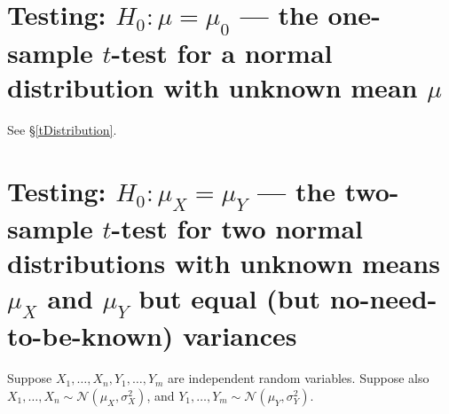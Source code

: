 \documentclass{article}
\begin{document}

\section{Testing: $H_{0} : \mu = \mu_{0}$ --- the one-sample $t$-test for a normal distribution with unknown mean $\mu$}
\setcounter{theorem}{0}

See \S\ref{tDistribution}.


\section{Testing: $H_{0} : \mu_{X} = \mu_{Y}$ --- the two-sample $t$-test for two normal distributions with unknown means $\mu_{X}$ and $\mu_{Y}$ but equal (but no-need-to-be-known) variances}
\setcounter{theorem}{0}

Suppose $X_{1},\ldots,X_{n},Y_{1},\ldots,Y_{m}$ are independent random variables.  Suppose also $X_{1},\ldots,X_{n} \sim \mathcal{N}(\mu_{X},\sigma^{2}_{X})$, and $Y_{1},\ldots,Y_{m} \sim \mathcal{N}(\mu_{Y},\sigma^{2}_{Y})$.
\end{document}
